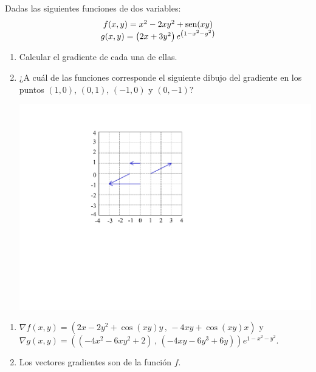 {Dadas las siguientes funciones de dos variables:
\[
\begin{array}{*{20}c}
   {f(x,y) = x^2  - 2xy^2  + \sen(xy)}  \\
   {g(x,y) = \left( {2x+ 3y^2 } \right)e^{\left( {1 - x^2  - y^2 } \right)} }  \\

 \end{array}
\]
\begin{enumerate}
\item Calcular el gradiente de cada una de ellas.
\item ¿A cuál de las funciones corresponde el siguiente dibujo del gradiente en los puntos $(1,0)$, $(0,1)$, $(-1,0)$ y $(0,-1)$?
\begin{center}
\includegraphics[scale=0.45,angle=270]{img/vectores-par-13}
\end{center}
\end{enumerate}
}
{\begin{enumerate}
\item $\nabla f(x,y) = \left(2x-2y^2+\cos(xy)y\, ,\, -4xy+\cos(xy)x\right)$  y
$\nabla g(x,y) = \left((-4x^2-6xy^2+2)\, ,\, (-4xy-6y^3+6y)\right)e^{1-x^2-y^2}$.
\item Los vectores gradientes son de la función $f$.
\end{enumerate}
}
